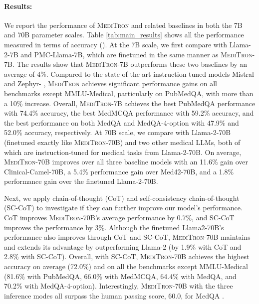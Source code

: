 \documentclass{article}
\newcommand{\llama}{\textnormal{Llama}}
\newcommand{\mtron}{\textsc{MediTron}\xspace}
\newcommand{\mtrona}{\textsc{MediTron-7B}\xspace}
\newcommand{\mtronb}{\textsc{MediTron-70B}\xspace}
\begin{document}
\paragraph{Results:}
We report the performance of \mtron and related baselines in both the 7B and 70B parameter scales. Table \ref{tab:main_results} shows all the performance measured in terms of accuracy (). At the 7B scale, we first compare with \llama-2-7B and PMC-\llama-7B, which are finetuned in the same manner as \mtrona. The results show that \mtrona outperforms these two baselines by an average of 4\%. Compared to the state-of-the-art instruction-tuned models Mistral \citep{jiang2023mistral} and Zephyr- \citep{tunstall2023zephyr}, \mtron achieves significant performance gains on all benchmarks except MMLU-Medical, particularly on PubMedQA, with more than a 10\% increase. Overall, \mtrona achieves the best PubMedQA performance with 74.4\% accuracy, the best MedMCQA performance with 59.2\% accuracy, and the best performance on both MedQA and MedQA-4-option with 47.9\% and 52.0\% accuracy, respectively. At 70B scale, we compare with \llama-2-70B (finetuned exactly like \mtronb) and two other medical LLMs, both of which are instruction-tuned for medical tasks from \llama-2-70B. On average, \mtronb improves over all three baseline models with an 11.6\% gain over Clinical-Camel-70B, a 5.4\% performance gain over Med42-70B, and a 1.8\% performance gain over the finetuned \llama-2-70B.

Next, we apply chain-of-thought (CoT) and self-consistency chain-of-thought (SC-CoT) to investigate if they can further improve our model's performance. CoT improves \mtronb's average performance by 0.7\%, and SC-CoT improves the performance by 3\%. Although the finetuned \llama2-70B's performance also improves through CoT and SC-CoT, \mtronb maintains and extends its advantage by outperforming \llama-2 (by 1.9\%  with CoT and 2.8\% with SC-CoT). Overall, with SC-CoT, \mtronb achieves the highest accuracy on average (72.0\%) and on all the benchmarks except MMLU-Medical (81.6\% with PubMedQA, 66.0\% with MedMCQA, 64.4\% with MedQA, and 70.2\% with MedQA-4-option). Interestingly, \mtronb with the three inference modes all surpass the human passing score, 60.0, for MedQA \citep{tian2023opportunities}.
\end{document}
